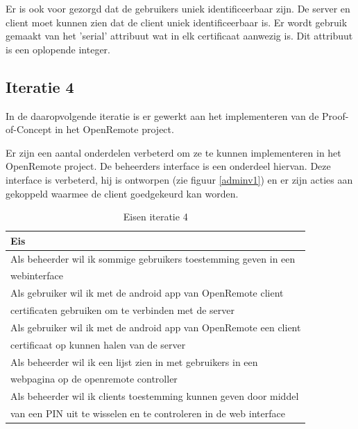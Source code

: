 \documentclass[]{article}
\begin{document}
Er is ook voor gezorgd dat de gebruikers uniek identificeerbaar zijn. De server
en client moet kunnen zien dat de client uniek identificeerbaar is. Er wordt
gebruik gemaakt van het 'serial' attribuut wat in elk certificaat aanwezig is.
Dit attribuut is een oplopende integer.

\subsection{Iteratie 4}
In de daaropvolgende iteratie is er gewerkt aan het implementeren van de
Proof-of-Concept in het OpenRemote project.

Er zijn een aantal onderdelen verbeterd om ze te kunnen implementeren in het
OpenRemote project. De beheerders
interface is een onderdeel hiervan. Deze interface is verbeterd, hij is
ontworpen (zie figuur \ref{adminv1}) en er zijn acties aan gekoppeld 
waarmee de client goedgekeurd kan worden.

\begin{table}[htpb]
  \caption{Eisen iteratie 4}
  \begin{center}
    \begin{tabular}{|| l ||}\hline
        Eis                                                              \\\hline\hline
        Als beheerder wil ik sommige gebruikers toestemming geven in een \\ 
        webinterface                                                     \\\hline
        Als gebruiker wil ik met de android app van OpenRemote client    \\ 
        certificaten gebruiken om te verbinden met de server             \\\hline
        Als gebruiker wil ik met de android app van OpenRemote een client\\
        certificaat op kunnen halen van de server                        \\\hline
        Als beheerder wil ik een lijst zien in met gebruikers in een     \\ 
        webpagina op de openremote controller                            \\\hline
        Als beheerder wil ik clients toestemming kunnen geven door middel\\ 
        van een PIN uit te wisselen en te controleren in de web interface\\\hline
    \end{tabular}
  \end{center}
\end{table}
\end{document}

